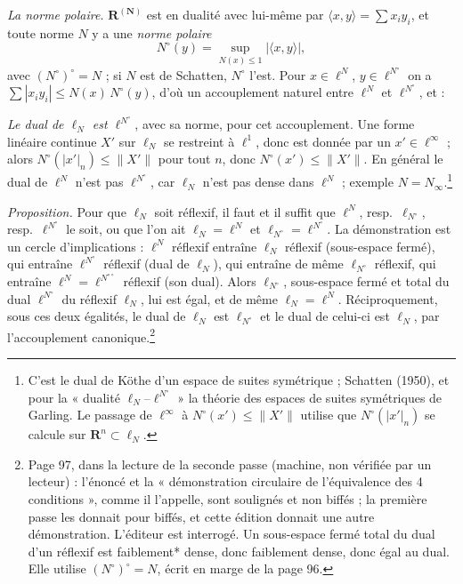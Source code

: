 \documentclass[11pt,a4paper]{article}
\begin{document}
\emph{La norme polaire.} $\mathbf{R}^{(\mathbf{N})}$ est en dualité avec
lui-même par $\langle x, y\rangle = \sum x_i y_i$, et toute norme $N$ y a
une \emph{norme polaire}
\[
  N^{\circ}(y) = \sup_{N(x) \leq 1} |\langle x, y\rangle| ,
\]
avec $(N^{\circ})^{\circ} = N$ ; si $N$ est de Schatten, $N^{\circ}$ l'est.
Pour $x \in \ell^N$, $y \in \ell^{N^{\circ}}$ on a $\sum |x_i y_i| \leq N(x)\,
N^{\circ}(y)$, d'où un accouplement naturel entre $\ell^N$ et
$\ell^{N^{\circ}}$, et :

\emph{Le dual de $\ell_N$ est $\ell^{N^{\circ}}$}, avec sa norme, pour cet
accouplement. Une forme linéaire continue $X'$ sur $\ell_N$ se restreint
à $\ell^1$, donc est donnée par un $x' \in \ell^\infty$ ; alors
$N^{\circ}(|x'|_n) \leq \|X'\|$ pour tout $n$, donc $N^{\circ}(x') \leq
\|X'\|$. En général le dual de $\ell^N$ n'est pas $\ell^{N^{\circ}}$, car
$\ell_N$ n'est pas dense dans $\ell^N$ ; exemple $N = N_\infty$.\footnote{C'est
le dual de Köthe d'un espace de suites symétrique ; Schatten (1950), et
pour la « dualité $\ell_N$--$\ell^{N^{\circ}}$ » la théorie des espaces
de suites symétriques de Garling. Le passage de $\ell^\infty$ à
$N^{\circ}(x') \leq \|X'\|$ utilise que $N^{\circ}(|x'|_n)$ se calcule sur
$\mathbf{R}^n \subset \ell_N$.}

\emph{Proposition.} Pour que $\ell_N$ soit réflexif, il faut et il suffit que
$\ell^N$, resp.\ $\ell_{N^{\circ}}$, resp.\ $\ell^{N^{\circ}}$ le soit, ou
que l'on ait $\ell_N = \ell^N$ et $\ell_{N^{\circ}} = \ell^{N^{\circ}}$. La
démonstration est un cercle d'implications : $\ell^N$ réflexif entraîne
$\ell_N$ réflexif (sous-espace fermé), qui entraîne $\ell^{N^{\circ}}$
réflexif (dual de $\ell_N$), qui entraîne de même $\ell_{N^{\circ}}$ réflexif,
qui entraîne $\ell^N = \ell^{N^{\circ\circ}}$ réflexif (son dual). Alors
$\ell_{N^{\circ}}$, sous-espace fermé et total du dual $\ell^{N^{\circ}}$ du
réflexif $\ell_N$, lui est égal, et de même $\ell_N = \ell^N$.
Réciproquement, sous ces deux égalités, le dual de $\ell_N$ est
$\ell_{N^{\circ}}$ et le dual de celui-ci est $\ell_N$, par l'accouplement
canonique.\footnote{Page 97, dans la lecture de la seconde passe (machine,
non vérifiée par un lecteur) : l'énoncé et la « démonstration circulaire de
l'équivalence des 4 conditions », comme il l'appelle, sont soulignés et non
biffés ; la première passe les donnait pour biffés, et cette édition
donnait une autre démonstration. L'éditeur est interrogé. Un sous-espace
fermé total du dual d'un réflexif est faiblement* dense, donc faiblement
dense, donc égal au dual. Elle utilise $(N^{\circ})^{\circ} = N$, écrit en
marge de la page 96.}
\end{document}
